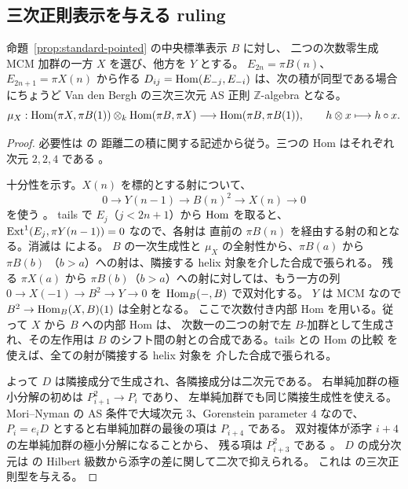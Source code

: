 
\subsection{三次正則表示を与える ruling}
\label{subsec:cubic-ruling}

\begin{proposition}[三次型の判定]
\label{prop:cubic-ruling}
命題~\ref{prop:standard-pointed} の中央標準表示 $B$ に対し、
二つの次数零生成 MCM 加群の一方 $X$ を選び、他方を $Y$ とする。
$E_{2n}=\pi B(n)$、$E_{2n+1}=\pi X(n)$ から作る
$D_{ij}=\operatorname{Hom}(E_{-j},E_{-i})$ は、次の積が同型である場合にちょうど
Van den Bergh の三次三次元 AS 正則 $\mathbb Z$-algebra となる。
\[
 \mu_X:\operatorname{Hom}(\pi X,\pi B(1))\otimes_k\operatorname{Hom}(\pi B,\pi X)
       \longrightarrow \operatorname{Hom}(\pi B,\pi B(1)),\qquad h\otimes x\longmapsto h\circ x .
\]
\end{proposition}

\begin{proof}
必要性は \cite[arXiv v3, \S 5.1, (Q2)--(Q3)]{VdB2011} の
距離二の積に関する記述から従う。三つの Hom はそれぞれ次元 $2,2,4$ である
\cite[Lemmas 5.6, 5.9]{MU2021}。

十分性を示す。$X(n)$ を標的とする射について、
\[
 0\longrightarrow Y(n-1)\longrightarrow B(n)^2\longrightarrow X(n)
   \longrightarrow0
\]
を使う \cite[Proposition 5.5(1)]{MU2021}。
tails で $E_j$（$j<2n+1$）から $\operatorname{Hom}$ を取ると、
$\operatorname{Ext}^1(E_j,\pi Y(n-1))=0$ なので、各射は
直前の $\pi B(n)$ を経由する射の和となる。消滅は
\cite[Lemmas 5.6(8), 5.9(2), 5.11]{MU2021} による。
$B$ の一次生成性と $\mu_X$ の全射性から、$\pi B(a)$ から $\pi B(b)$
（$b>a$）への射は、隣接する helix 対象を介した合成で張られる。
残る $\pi X(a)$ から $\pi B(b)$（$b>a$）への射に対しては、もう一方の列
$0\to X(-1)\to B^2\to Y\to0$ を $\operatorname{Hom}_B(-,B)$ で双対化する。
$Y$ は MCM なので $B^2\to\operatorname{Hom}_B(X,B)(1)$ は全射となる。
ここで次数付き内部 Hom を用いる。従って $X$ から $B$ への内部 Hom は、
次数一の二つの射で左 $B$-加群として生成され、その左作用は
$B$ のシフト間の射との合成である。tails との Hom の比較
\cite[Lemma 5.9(1)]{MU2021} を使えば、全ての射が隣接する helix 対象を
介した合成で張られる。

よって $D$ は隣接成分で生成され、各隣接成分は二次元である。
右単純加群の極小分解の初めは $P_{i+1}^2\to P_i$ であり、
左単純加群でも同じ隣接生成性を使える。
Mori--Nyman の AS 条件で大域次元 $3$、Gorenstein parameter $4$ なので、
$P_i=e_iD$ とすると右単純加群の最後の項は $P_{i+4}$ である。
双対複体が添字 $i+4$ の左単純加群の極小分解になることから、
残る項は $P_{i+3}^2$ である
\cite[arXiv v1, Theorem 4.5 and Remark 4.6]{MN2025}。
$D$ の成分次元は \cite[Lemmas 5.6, 5.9]{MU2021} の
Hilbert 級数から添字の差に関して二次で抑えられる。
これは \cite[arXiv v3, Definitions 4.1.1--4.1.2]{VdB2011} の三次正則型を与える。
\end{proof}

